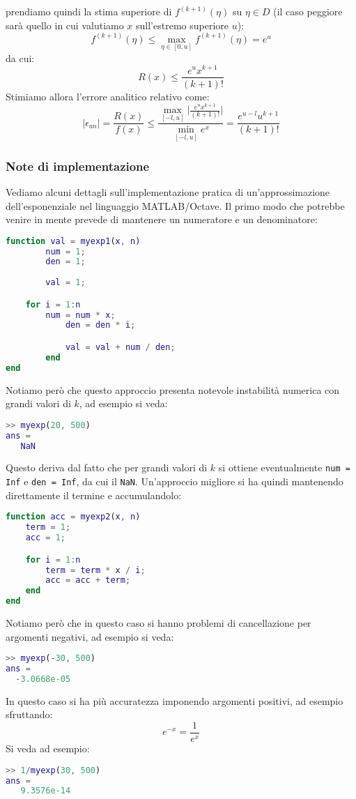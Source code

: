 \documentclass[a4paper,11pt]{article}
\begin{document}
prendiamo quindi la stima superiore di $f^{(k + 1)}(\eta)$ su $\eta \in D$ (il caso peggiore sarà quello in cui valutiamo $x$ sull'estremo superiore $u$):
$$
f^{(k + 1)} (\eta) \leq \max_{\eta \in [0, u]} f^{( k + 1)}(\eta) = e^u
$$
da cui:
$$
R(x) \leq \frac{e^u x^{k + 1}}{(k + 1)!}
$$
Stimiamo allora l'errore analitico relativo come:
$$
|\epsilon_{an}| = \frac{R(x)}{f(x)} \leq \frac{ \max_{[-l, u]} \Big| \frac{e^ux^{k + 1}}{(k + 1)!} \Big| }{ \min_{[-l, u]} e^x } = \frac{e^{u-l}u^{k+1}}{(k+1)!}
$$

\subsubsection{Note di implementazione}
Vediamo alcuni dettagli sull'implementazione pratica di un'approssimazione dell'esponenziale nel linguaggio MATLAB/Octave.
Il primo modo che potrebbe venire in mente prevede di mantenere un numeratore e un denominatore:
\begin{lstlisting}[language=matlab, style=codestyle]	
function val = myexp1(x, n)
		num = 1;
		den = 1;
		
		val = 1;

    for i = 1:n
    	num = num * x;
			den = den * i;

			val = val + num / den;
		end
end
\end{lstlisting}

Notiamo però che questo approccio presenta notevole instabilità numerica con grandi valori di $k$, ad esempio si veda:
\begin{lstlisting}[language=matlab, style=codestyle]	
>> myexp(20, 500)
ans =
   NaN
\end{lstlisting}

\lstset{language = matlab, style = codestyle}

Questo deriva dal fatto che per grandi valori di $k$ si ottiene eventualmente \lstinline|num = Inf| e \lstinline|den = Inf|, da cui il \lstinline|NaN|.
Un'approccio migliore si ha quindi mantenendo direttamente il termine e accumulandolo:
\begin{lstlisting}[language=matlab, style=codestyle]	
function acc = myexp2(x, n)
    term = 1;
    acc = 1;

    for i = 1:n
        term = term * x / i;
        acc = acc + term;
    end
end
\end{lstlisting}

Notiamo però che in questo caso si hanno problemi di cancellazione per argomenti negativi, ad esempio si veda:
\begin{lstlisting}[language=matlab, style=codestyle]	
>> myexp(-30, 500)
ans =
  -3.0668e-05
\end{lstlisting}
In questo caso si ha più accuratezza imponendo argomenti positivi, ad esempio sfruttando:
$$
e^{-x} = \frac{1}{e^x}
$$
Si veda ad esempio:
\begin{lstlisting}[language=matlab, style=codestyle]	
>> 1/myexp(30, 500)
ans =
   9.3576e-14
\end{lstlisting}
\end{document}
